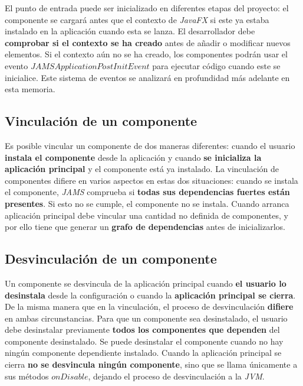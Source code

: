 El punto de entrada puede ser inicializado en diferentes
etapas del proyecto: el componente se cargará antes que el contexto
de \textit{JavaFX} si este ya estaba instalado en la aplicación
cuando esta se lanza.
El desarrollador debe \textbf{comprobar si el contexto se ha creado}
antes de añadir o modificar nuevos elementos.
Si el contexto aún no se ha creado, los componentes podrán
usar el evento $JAMSApplicationPostInitEvent$ para ejecutar
código cuando este se inicialice.
Este sistema de eventos se analizará en profundidad más adelante en esta memoria.


\subsection{Vinculación de un componente}\label{subsec:vinculacion-de-un-componente}

Es posible vincular un componente de dos maneras diferentes:
cuando el usuario \textbf{instala el componente} desde la aplicación
y cuando \textbf{se inicializa la aplicación principal} y el componente
está ya instalado.
La vinculación de componentes difiere en varios aspectos en estas
dos situaciones: cuando se instala el componente, \textit{JAMS}
comprueba si \textbf{todas sus dependencias fuertes están presentes}.
Si esto no se cumple, el componente no se instala.
Cuando arranca aplicación principal debe vincular
una cantidad no definida de componentes, y por ello tiene que
generar un \textbf{grafo de dependencias} antes de inicializarlos.

\subsection{Desvinculación de un componente}\label{subsec:desvinculacion-de-un-componente}

Un componente se desvincula de la aplicación principal
cuando \textbf{el usuario lo desinstala} desde
la configuración o cuando la \textbf{aplicación principal se cierra}.
De la misma manera que en la vinculación, el proceso de
desvinculación \textbf{difiere} en ambas circunstancias.
Para que un componente sea desinstalado, el usuario
debe desinstalar previamente \textbf{todos los componentes
que dependen} del componente desinstalado.
Se puede desinstalar el componente cuando no hay
ningún componente dependiente instalado.
Cuando la aplicación principal se cierra
\textbf{no se desvincula ningún componente},
sino que se llama únicamente a sus métodos $onDisable$, dejando
el proceso de desvinculación a la \textit{JVM}.

